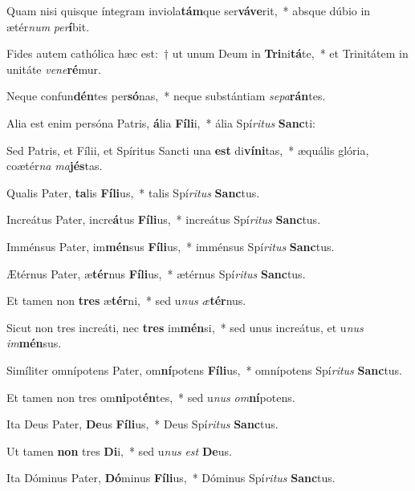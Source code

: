 \item Quam nisi quisque íntegram inviola\textbf{tám}que ser\textbf{vá}\textbf{ve}rit,~* absque dúbio in ætér\textit{num} \textit{per}\textbf{í}bit.
\item Fides autem cathólica hæc est:~† ut unum Deum in \textbf{Tri}ni\textbf{tá}te,~* et Trinitátem in unitáte \textit{ve}\textit{ne}\textbf{ré}mur.
\item Neque confun\textbf{dén}tes per\textbf{só}nas,~* neque substántiam \textit{se}\textit{pa}\textbf{rán}tes.
\item Alia est enim persóna Patris, \textbf{á}lia \textbf{Fí}\textbf{li}i,~* ália Spí\textit{ri}\textit{tus} \textbf{Sanc}ti:
\item Sed Patris, et Fílii, et Spíritus Sancti una \textbf{est} di\textbf{ví}\textbf{ni}tas,~* æquális glória, coætér\textit{na} \textit{ma}\textbf{jés}tas.
\item Qualis Pater, \textbf{ta}lis \textbf{Fí}\textbf{li}us,~* talis Spí\textit{ri}\textit{tus} \textbf{Sanc}tus.
\item Increátus Pater, incre\textbf{á}tus \textbf{Fí}\textbf{li}us,~* increátus Spí\textit{ri}\textit{tus} \textbf{Sanc}tus.
\item Imménsus Pater, im\textbf{mén}sus \textbf{Fí}\textbf{li}us,~* imménsus Spí\textit{ri}\textit{tus} \textbf{Sanc}tus.
\item Ætérnus Pater, æ\textbf{tér}nus \textbf{Fí}\textbf{li}us,~* ætérnus Spí\textit{ri}\textit{tus} \textbf{Sanc}tus.
\item Et tamen non \textbf{tres} æ\textbf{tér}ni,~* sed u\textit{nus} \textit{æ}\textbf{tér}nus.
\item Sicut non tres increáti, nec \textbf{tres} im\textbf{mén}si,~* sed unus increátus, et u\textit{nus} \textit{im}\textbf{mén}sus.
\item Simíliter omnípotens Pater, om\textbf{ní}potens \textbf{Fí}\textbf{li}us,~* omnípotens Spí\textit{ri}\textit{tus} \textbf{Sanc}tus.
\item Et tamen non tres om\textbf{ni}pot\textbf{én}tes,~* sed u\textit{nus} \textit{om}\textbf{ní}potens.
\item Ita Deus Pater, \textbf{De}us \textbf{Fí}\textbf{li}us,~* Deus Spí\textit{ri}\textit{tus} \textbf{Sanc}tus.
\item Ut tamen \textbf{non} tres \textbf{Di}i,~* sed u\textit{nus} \textit{est} \textbf{De}us.
\item Ita Dóminus Pater, \textbf{Dó}minus \textbf{Fí}\textbf{li}us,~* Dóminus Spí\textit{ri}\textit{tus} \textbf{Sanc}tus.
